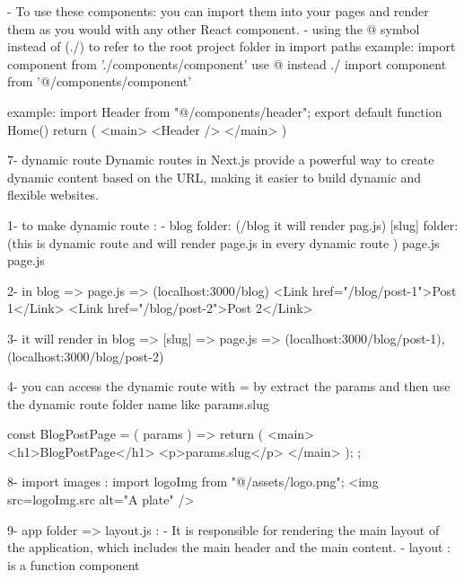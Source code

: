     - To use these components: 
        you can import them into your pages and render them as you would with any other React component.
    - using the @ symbol  instead of (./) to refer to the root project folder in import paths
        example: 
                import component from './components/component'
            use @ instead ./
                import component from '@/components/component'

        example: 
            import Header from "@/components/header";
            export default function Home() {
                        return (
                            <main>
                            <Header />
                            </main>
                        )}

7- dynamic route
        Dynamic routes in Next.js provide a powerful way to create dynamic content based on the URL,
        making it easier to build dynamic and flexible websites.

       1- to make dynamic route :
            - blog folder:   (/blog it will render pag.js)
                    [slug] folder: (this is dynamic route and will render page.js in every dynamic route )
                            page.js 
                    page.js

        2-    in blog => page.js =>  (localhost:3000/blog)
                        <Link href="/blog/post-1">Post 1</Link>
                        <Link href="/blog/post-2">Post 2</Link>
            
        3-    it will render in blog => [slug] => page.js => (localhost:3000/blog/post-1), (localhost:3000/blog/post-2)

        4- you can access the dynamic route with 
            = by extract the {params} and then use the dynamic route folder name 
                like {params.slug}
                
                const BlogPostPage = ({ params }) => {
                            return (
                                <main>
                                <h1>BlogPostPage</h1>
                                <p>{params.slug}</p>
                                </main>
                            );
                            };

8- import images :
        import logoImg from "@/assets/logo.png";
        <img src={logoImg.src} alt="A plate" />

9- app folder => layout.js : 
        - It is responsible for rendering the main layout of the application, which includes the main header and the main content.
        - layout : is a function component

